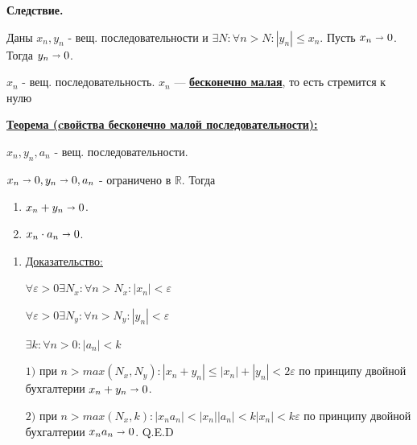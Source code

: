 \documentclass{article}
\newcommand{\deff}[1]{\underline{\textbf{#1}}}
\newcommand{\thmm}[1]{\underline{\textbf{#1}}}
\begin{document}
\textbf{Следствие.}

Даны $x_n,y_n$ - вещ. последовательности и $\exists N:\forall n>N: |y_n|\leq x_n$. Пусть $x_n \shortrightarrow 0$. Тогда $y_n \shortrightarrow 0$.

$x_n$ - вещ. последовательность. $x_n$ --- \deff{бесконечно малая}, то есть стремится к нулю

\thmm{Теорема (cвойства бесконечно малой последовательности):}

$x_n,y_n,a_n$ - вещ. последовательности. 

$x_n \shortrightarrow 0, y_n \shortrightarrow 0, a_n$ - ограничено в $\mathbb{R}$.
Тогда
\begin{enumerate}
    \item $x_n + y_n \shortrightarrow 0$.

    \item $x_n \cdot a_n \shortrightarrow 0$.

\end{enumerate}
\begin{enumerate}
    \item[] \uline{Доказательство:}

    $\forall \varepsilon > 0 \exists N_x: \forall n > N_x: |x_n|<\varepsilon$

    $\forall \varepsilon > 0 \exists N_y: \forall n > N_y: |y_n|<\varepsilon$

    $\exists k: \forall n>0: |a_n|<k$

    $1)$ при $n> max(N_x, N_y): |x_n+y_n|\leq|x_n|+|y_n|<2\varepsilon$ по принципу двойной бухгалтерии $x_n+y_n \shortrightarrow 0$.

    $2)$ при $n>max(N_x,k): |x_na_n|<|x_n||a_n|<k|x_n|<k\varepsilon$ по принципу двойной бухгалтерии $x_na_n \shortrightarrow 0$. Q.E.D
\end{enumerate}
\end{document}
